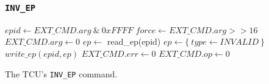 \documentclass[a4paper,11pt]{article}
\begin{document}
\subsubsection{\texttt{INV\_EP}}

\begin{algorithm}[H]
    $epid \gets EXT\_CMD.arg\ \&\ 0xFFFF$\;
    $force \gets EXT\_CMD.arg >> 16$\;
    \BlankLine
    $EXT\_CMD.arg \gets 0$\;
    \BlankLine
    $ep \gets$ read\_ep(epid)\;
    \BlankLine
    $ep \gets \{~type \gets INVALID~\}$\;
    $write\_ep(epid, ep)$\;
    \BlankLine
    $EXT\_CMD.err \gets 0$\;
    $EXT\_CMD.op \gets 0$\;
    \caption{The TCU's \texttt{INV\_EP} command.}
\end{algorithm}
\end{document}
